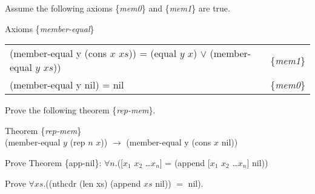 \begin{ExerciseList}
\Exercise Assume the following axioms \{\emph{mem0}\} and \{\emph{mem1}\} are true.
\begin{samepage}
\label{member-equal-equations}
\begin{center}
Axioms \{\emph{member-equal}\} \\
\begin{tabular}{ll}
(member-equal y (cons $x$ $xs$)) = (equal $y$ $x$) $\vee$ (member-equal $y$ $xs$)) & \{\emph{mem1}\} \\
(member-equal y nil) = nil                                                         & \{\emph{mem0}\} \\
\end{tabular}
\end{center}
\end{samepage}
Prove the following theorem \{\emph{rep-mem}\}.
\begin{samepage}
\label{rep-mem}
\begin{center}
Theorem \{\emph{rep-mem}\} \\
(member-equal $y$ (rep $n$ $x$)) $\rightarrow$ (member-equal y (cons $x$ nil))
\end{center}
\end{samepage}

\Exercise {}
Prove Theorem \{app-nil\}: $\forall n.$([$x_1$ $x_2$ \dots $x_{n}$] = (append [$x_1$ $x_2$ \dots $x_{n}$] nil))

\Exercise Prove $\forall xs.$((nthcdr (len xs) (append $xs$ nil)) $=$ nil).

\end{ExerciseList}


